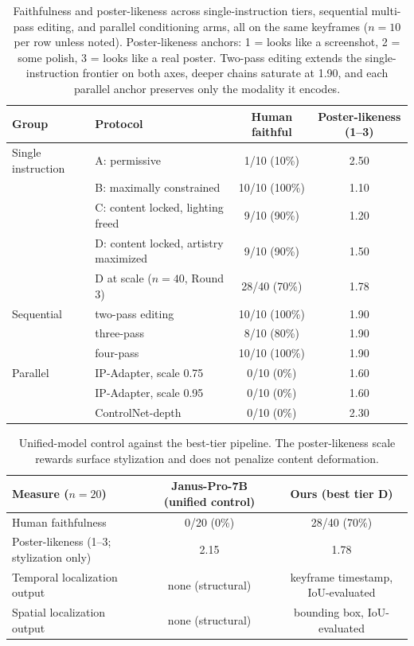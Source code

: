 \documentclass[10pt]{article}
\begin{document}
\begin{table}[htbp]
\centering
\small
\begin{tabular}{llcc}
\toprule
Group & Protocol & Human faithful & Poster-likeness (1--3) \\
\midrule
Single instruction & A: permissive & 1/10 (10\%) & 2.50 \\
 & B: maximally constrained & 10/10 (100\%) & 1.10 \\
 & C: content locked, lighting freed & 9/10 (90\%) & 1.20 \\
 & D: content locked, artistry maximized & 9/10 (90\%) & 1.50 \\
 & D at scale ($n=40$, Round 3) & 28/40 (70\%) & 1.78 \\
\midrule
Sequential & two-pass editing & 10/10 (100\%) & 1.90 \\
 & three-pass & 8/10 (80\%) & 1.90 \\
 & four-pass & 10/10 (100\%) & 1.90 \\
\midrule
Parallel & IP-Adapter, scale 0.75 & 0/10 (0\%) & 1.60 \\
 & IP-Adapter, scale 0.95 & 0/10 (0\%) & 1.60 \\
 & ControlNet-depth & 0/10 (0\%) & 2.30 \\
\bottomrule
\end{tabular}
\caption{Faithfulness and poster-likeness across single-instruction tiers, sequential multi-pass editing, and parallel conditioning arms, all on the same keyframes ($n=10$ per row unless noted). Poster-likeness anchors: 1 = looks like a screenshot, 2 = some polish, 3 = looks like a real poster. Two-pass editing extends the single-instruction frontier on both axes, deeper chains saturate at 1.90, and each parallel anchor preserves only the modality it encodes.}
\label{tab:frontier}
\end{table}

\begin{table}[htbp]
\centering
\small
\begin{tabular}{lcc}
\toprule
Measure ($n=20$) & Janus-Pro-7B (unified control) & Ours (best tier D) \\
\midrule
Human faithfulness & 0/20 (0\%) & 28/40 (70\%) \\
Poster-likeness (1--3; stylization only) & 2.15 & 1.78 \\
Temporal localization output & none (structural) & keyframe timestamp, IoU-evaluated \\
Spatial localization output & none (structural) & bounding box, IoU-evaluated \\
\bottomrule
\end{tabular}
\caption{Unified-model control against the best-tier pipeline. The poster-likeness scale rewards surface stylization and does not penalize content deformation.}
\label{tab:unified}
\end{table}
\end{document}
